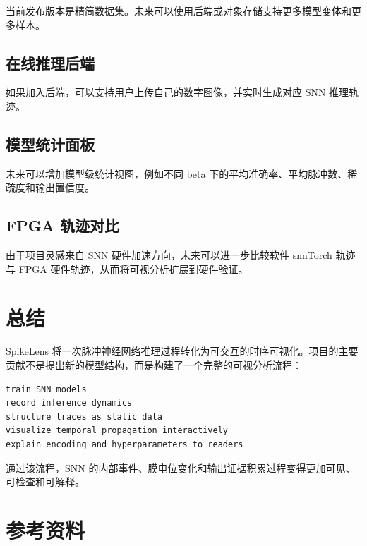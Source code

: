 \documentclass[UTF8,11pt,a4paper]{ctexart}
\newcommand{\projecttitle}{SpikeLens}
\begin{document}
当前发布版本是精简数据集。未来可以使用后端或对象存储支持更多模型变体和更多样本。

\subsection{在线推理后端}

如果加入后端，可以支持用户上传自己的数字图像，并实时生成对应 SNN 推理轨迹。

\subsection{模型统计面板}

未来可以增加模型级统计视图，例如不同 beta 下的平均准确率、平均脉冲数、稀疏度和输出置信度。

\subsection{FPGA 轨迹对比}

由于项目灵感来自 SNN 硬件加速方向，未来可以进一步比较软件 snnTorch 轨迹与 FPGA 硬件轨迹，从而将可视分析扩展到硬件验证。

\section{总结}

\projecttitle{} 将一次脉冲神经网络推理过程转化为可交互的时序可视化。项目的主要贡献不是提出新的模型结构，而是构建了一个完整的可视分析流程：

\begin{lstlisting}
train SNN models
record inference dynamics
structure traces as static data
visualize temporal propagation interactively
explain encoding and hyperparameters to readers
\end{lstlisting}

通过该流程，SNN 的内部事件、膜电位变化和输出证据积累过程变得更加可见、可检查和可解释。

\section{参考资料}
\end{document}
